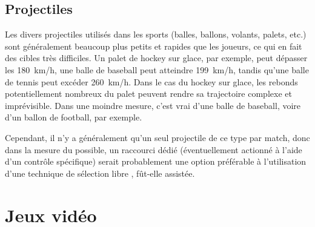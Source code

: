 	
	\subsection{Projectiles}
	Les divers projectiles utilisés dans les sports (balles, ballons, volants, palets, etc.) sont généralement beaucoup plus petits et rapides que les joueurs, ce qui en fait des cibles très difficiles. Un palet de hockey sur glace, par exemple, peut dépasser les 180~km/h\footnotemark, une balle de baseball peut atteindre 199~km/h\footnotemark, tandis qu'une balle de tennis peut excéder 260~km/h\footnotemark. Dans le cas du hockey sur glace, les rebonds potentiellement nombreux du palet peuvent rendre sa trajectoire complexe et imprévisible. Dans une moindre mesure, c'est vrai d'une balle de baseball, voire d'un ballon de football, par exemple.
	
	Cependant, il n'y a généralement qu'un seul projectile de ce type par match, donc dans la mesure du possible, un raccourci dédié (éventuellement actionné à l'aide d'un contrôle spécifique) serait probablement une option préférable à l'utilisation d'une technique de sélection \og libre \fg{} , fût-elle assistée.
	
	\addtocounter{footnote}{-2}
	
	\addtocounter{footnote}{1}
	
	\addtocounter{footnote}{1}
	
	
	\section{Jeux vidéo}
